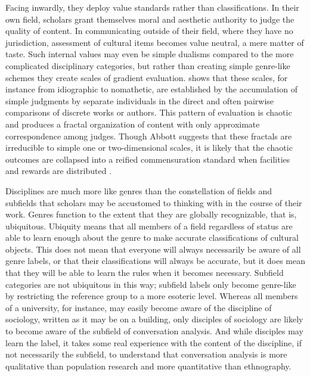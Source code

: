 \documentclass[]{book}
\theoremstyle{definition}
\theoremstyle{definition}
\theoremstyle{definition}
\theoremstyle{remark}
\begin{document}
Facing inwardly, they deploy value standards rather than
classifications. In their own field, scholars grant themselves moral and
aesthetic authority to judge the quality of content. In communicating
outside of their field, where they have no jurisdiction, assessment of
cultural items becomes value neutral, a mere matter of taste. Such
internal values may even be simple dualisms compared to the more
complicated disciplinary categories, but rather than creating simple
genre-like schemes they create scales of gradient evaluation.
\citet{Abbott2001Chaos} shows that these scales, for instance from
idiographic to nomathetic, are established by the accumulation of simple
judgments by separate individuals in the direct and often pairwise
comparisons of discrete works or authors. This pattern of evaluation is
chaotic and produces a fractal organization of content with only
approximate correspondence among judges. Though Abbott
\citeyearpar[14]{Abbott2001Chaos} suggests that these fractals are
irreducible to simple one or two-dimensional scales, it is likely that
the chaotic outcomes are collapsed into a reified commensuration
standard when facilities and rewards are distributed
\citep{Espeland1998Commensuration}.

Disciplines are much more like genres than the constellation of fields
and subfields that scholars may be accustomed to thinking with in the
course of their work. Genres function to the extent that they are
globally recognizable, that is, ubiquitous. Ubiquity means that all
members of a field regardless of status are able to learn enough about
the genre to make accurate classifications of cultural objects. This
does not mean that everyone will always necessarily be aware of all
genre labels, or that their classifications will always be accurate, but
it does mean that they will be able to learn the rules when it becomes
necessary. Subfield categories are not ubiquitous in this way; subfield
labels only become genre-like by restricting the reference group to a
more esoteric level. Whereas all members of a university, for instance,
may easily become aware of the discipline of sociology, written as it
may be on a building, only disciples of sociology are likely to become
aware of the subfield of conversation analysis. And while disciples may
learn the label, it takes some real experience with the content of the
discipline, if not necessarily the subfield, to understand that
conversation analysis is more qualitative than population research and
more quantitative than ethnography.
\end{document}

